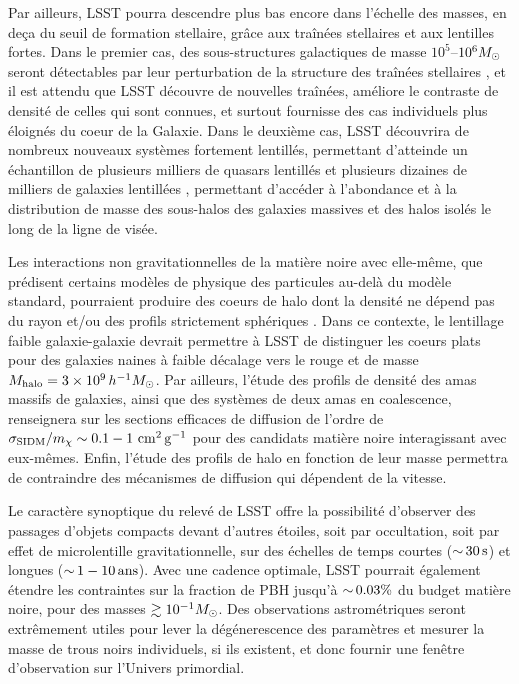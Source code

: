 \documentclass[12pt]{article}
\begin{document}
Par ailleurs, LSST pourra descendre plus bas encore dans l'échelle des masses, en deça du seuil de formation stellaire, grâce aux traînées stellaires et aux lentilles fortes. Dans le premier cas, des sous-structures galactiques de masse $10^5$--$10^6 M_\odot$ seront détectables par leur perturbation de la structure des traînées stellaires \citep[][]{erkal2016,bovy:2017}, et il est attendu que LSST découvre de nouvelles traînées, améliore le contraste de densité de celles qui sont connues, et surtout fournisse des cas individuels plus éloignés du coeur de la Galaxie. Dans le deuxième cas, LSST découvrira de nombreux nouveaux systèmes fortement lentillés, permettant d'atteinde un échantillon de plusieurs milliers de quasars lentillés \citep{O+M10} et plusieurs dizaines de milliers de galaxies lentillées \citep{Collett2015}, permettant d'accéder à l'abondance et à la distribution de masse des sous-halos des galaxies massives et des halos isolés le long de la ligne de visée.

Les interactions non gravitationnelles de la matière noire avec elle-même, que prédisent certains modèles de physique des particules au-delà du modèle standard, pourraient produire des coeurs de halo dont la densité ne dépend pas du rayon \citep[coeurs `plats', ][]{Spergel:1999mh} et/ou des profils strictement sphériques \citep{Peter:2013}.
Dans ce contexte, le lentillage faible galaxie-galaxie devrait permettre à LSST de distinguer les coeurs plats pour des galaxies naines à faible décalage vers le rouge et de masse $M_\text{halo} = 3\times10^9\,h^{-1}M_\odot$. Par ailleurs, l'étude des profils de densité des amas massifs de galaxies, ainsi que des systèmes de deux amas en coalescence, renseignera sur les sections efficaces de diffusion de l'ordre de $\sigma_{\rm SIDM}/m_\chi \sim 0.1-1 \mathrm{\,\mathrm{\,cm}^2\mathrm{\,g}^{-1}}$ pour des candidats matière noire interagissant avec eux-mêmes. Enfin, l'étude des profils de halo en fonction de leur masse permettra de contraindre des mécanismes de diffusion qui dépendent de la vitesse. 

Le caractère synoptique du relevé de LSST offre la possibilité d’observer des passages d'objets compacts devant d’autres étoiles, soit par occultation, soit par effet de microlentille gravitationnelle,
sur des échelles de temps courtes ($ {\sim}\, 30 \mathrm{\,s}$) et longues ($ {\sim}\,1-10 \mathrm{\,ans}$)\citep{1509.04899}. 
Avec une cadence optimale, LSST pourrait également étendre les contraintes sur la fraction de PBH jusqu'à $ {\sim}\,0.03\%$ du budget matière noire, pour des masses $\gtrsim 10^{-1} M_\odot$. Des observations astrométriques seront extrêmement utiles pour lever la dégénerescence des paramètres et mesurer la masse de trous noirs individuels, si ils existent, et donc fournir une fenêtre d'observation sur l'Univers primordial.
\end{document}
